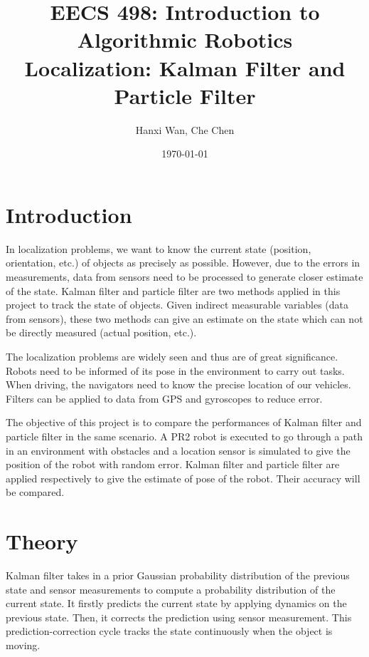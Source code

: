 \documentclass[letterpaper,11pt]{article}
\begin{document}
\title{EECS 498: Introduction to Algorithmic Robotics \\\textbf{Localization: Kalman Filter and Particle Filter}}
\author{Hanxi Wan, Che Chen}
\date{\today}
\maketitle

\section{Introduction}

In localization problems, we want to know the current state (position, orientation, etc.) of objects as precisely as possible. However, due to the errors in measurements, data from sensors need to be processed to generate closer estimate of the state. Kalman filter and particle filter are two methods applied in this project to track the state of objects. Given indirect measurable variables (data from sensors), these two methods can give an estimate on the state which can not be directly measured (actual position, etc.).

The localization problems are widely seen and thus are of great significance. Robots need to be informed of its pose in the environment to carry out tasks. When driving, the navigators need to know the precise location of our vehicles. Filters can be applied to data from GPS and gyroscopes to reduce error.

The objective of this project is to compare the performances of Kalman filter and particle filter in the same scenario. A PR2 robot is executed to go through a path in an environment with obstacles and a location sensor is simulated to give the position of the robot with random error. Kalman filter and particle filter are applied respectively to give the estimate of pose of the robot. Their accuracy will be compared.


\section{Theory}

Kalman filter takes in a prior Gaussian probability distribution of the previous state and sensor measurements to compute a probability distribution of the current state. It firstly predicts the current state by applying dynamics on the previous state. Then, it corrects the prediction using sensor measurement. This prediction-correction cycle tracks the state continuously when the object is moving. \cite{kf}
\end{document}
